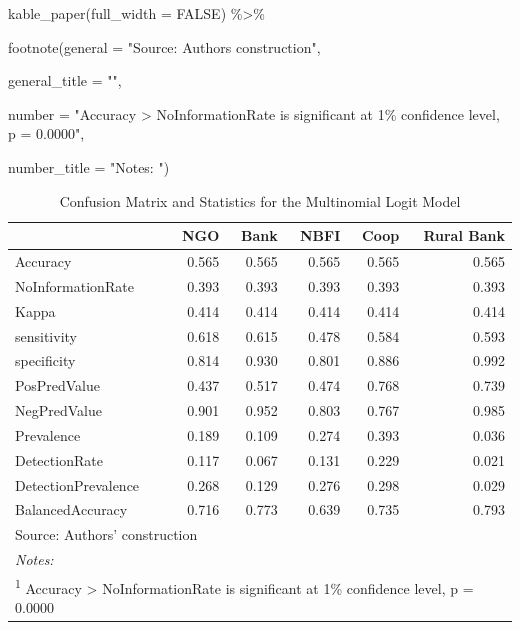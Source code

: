 \documentclass[a4paper,nobind]{templates/ociamthesis}
\newenvironment{Shaded}{\begin{snugshade}}{\end{snugshade}}
\newcommand{\AttributeTok}[1]{\textcolor[rgb]{0.77,0.63,0.00}{#1}}
\newcommand{\ConstantTok}[1]{\textcolor[rgb]{0.00,0.00,0.00}{#1}}
\newcommand{\FunctionTok}[1]{\textcolor[rgb]{0.00,0.00,0.00}{#1}}
\newcommand{\NormalTok}[1]{#1}
\newcommand{\SpecialCharTok}[1]{\textcolor[rgb]{0.00,0.00,0.00}{#1}}
\newcommand{\StringTok}[1]{\textcolor[rgb]{0.31,0.60,0.02}{#1}}
\renewenvironment{Shaded}
{
  \vspace{10pt}%
  \begin{snugshade}%
}{%
  \end{snugshade}%
  \vspace{8pt}%
}
\begin{document}
\begin{Shaded}
\begin{Highlighting}[]
  \FunctionTok{kable\_paper}\NormalTok{(}\AttributeTok{full\_width =} \ConstantTok{FALSE}\NormalTok{) }\SpecialCharTok{\%\textgreater{}\%} 
  
  \FunctionTok{footnote}\NormalTok{(}\AttributeTok{general =} \StringTok{"Source: Authors\textquotesingle{} construction"}\NormalTok{,}
           
  \AttributeTok{general\_title =} \StringTok{""}\NormalTok{,}
  
  \AttributeTok{number =} \StringTok{"Accuracy \textgreater{} NoInformationRate is significant at 1\% confidence level, p = 0.0000"}\NormalTok{,}
  
  \AttributeTok{number\_title =} \StringTok{"Notes: "}\NormalTok{)}
\end{Highlighting}
\end{Shaded}

\begin{table}

\caption{\label{tab:unnamed-chunk-47}Confusion Matrix and Statistics for the Multinomial Logit Model}
\centering
\begin{tabular}[t]{lrrrrr}
\toprule
  & NGO & Bank & NBFI & Coop & Rural Bank\\
\midrule
Accuracy & 0.565 & 0.565 & 0.565 & 0.565 & 0.565\\
NoInformationRate & 0.393 & 0.393 & 0.393 & 0.393 & 0.393\\
Kappa & 0.414 & 0.414 & 0.414 & 0.414 & 0.414\\
sensitivity & 0.618 & 0.615 & 0.478 & 0.584 & 0.593\\
specificity & 0.814 & 0.930 & 0.801 & 0.886 & 0.992\\
\addlinespace
PosPredValue & 0.437 & 0.517 & 0.474 & 0.768 & 0.739\\
NegPredValue & 0.901 & 0.952 & 0.803 & 0.767 & 0.985\\
Prevalence & 0.189 & 0.109 & 0.274 & 0.393 & 0.036\\
DetectionRate & 0.117 & 0.067 & 0.131 & 0.229 & 0.021\\
DetectionPrevalence & 0.268 & 0.129 & 0.276 & 0.298 & 0.029\\
\addlinespace
BalancedAccuracy & 0.716 & 0.773 & 0.639 & 0.735 & 0.793\\
\bottomrule
\multicolumn{6}{l}{\rule{0pt}{1em}Source: Authors' construction}\\
\multicolumn{6}{l}{\rule{0pt}{1em}\textit{Notes: }}\\
\multicolumn{6}{l}{\rule{0pt}{1em}\textsuperscript{1} Accuracy > NoInformationRate is significant at 1\% confidence level, p = 0.0000}\\
\end{tabular}
\end{table}
\end{document}
